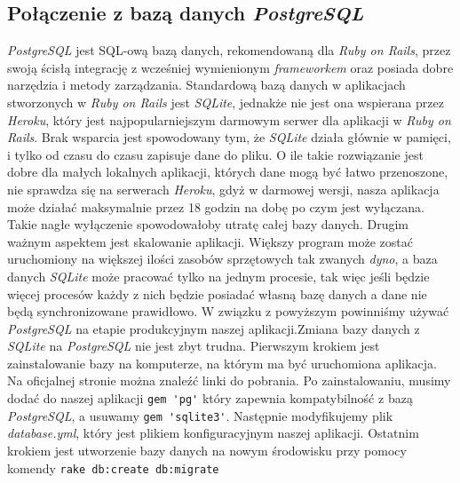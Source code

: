 \documentclass[openright]{xmgr}
\begin{document}
\subsection{Połączenie z bazą danych \textit{PostgreSQL}}
\textit{PostgreSQL} jest SQL-ową bazą danych, rekomendowaną dla \textit{Ruby on Rails}, przez swoją ścisłą integrację z wcześniej wymienionym \textit{frameworkem} oraz posiada dobre narzędzia i metody zarządzania. Standardową bazą danych w aplikacjach stworzonych w \textit{Ruby on Rails} jest \textit{SQLite}, jednakże nie jest ona wspierana przez \textit{Heroku}, który jest najpopularniejszym darmowym serwer dla aplikacji w \textit{Ruby on Rails}. Brak wsparcia jest spowodowany tym, że \textit{SQLite} działa głównie w pamięci, i tylko od czasu do czasu zapisuje dane do pliku. O ile takie rozwiązanie jest dobre dla małych lokalnych aplikacji, których dane mogą być łatwo przenoszone, nie sprawdza się na serwerach \textit{Heroku}, gdyż w darmowej wersji, nasza aplikacja może działać maksymalnie przez 18 godzin na dobę po czym jest wyłączana. Takie nagłe wyłączenie spowodowałoby utratę całej bazy danych. Drugim ważnym aspektem jest skalowanie aplikacji. Większy program może zostać uruchomiony na większej ilości zasobów sprzętowych tak zwanych \textit{dyno}, a baza danych \textit{SQLite} może pracować tylko na jednym procesie, tak więc jeśli będzie więcej procesów każdy z nich będzie posiadać własną bazę danych a dane nie będą synchronizowane prawidłowo. W związku z powyższym powinniśmy używać \textit{PostgreSQL} na etapie produkcyjnym naszej aplikacji.\newline \indent Zmiana bazy danych z \textit{SQLite} na \textit{PostgreSQL} nie jest zbyt trudna. Pierwszym krokiem jest zainstalowanie bazy na komputerze, na którym ma być uruchomiona aplikacja. Na oficjalnej stronie można znaleźć linki do pobrania. Po zainstalowaniu, musimy dodać do naszej aplikacji \verb|gem 'pg'| który zapewnia kompatybilność z bazą \textit{PostgreSQL}, a usuwamy \verb|gem 'sqlite3'|. Następnie modyfikujemy plik \textit{database.yml}, który jest plikiem konfiguracyjnym naszej aplikacji. Ostatnim krokiem jest utworzenie bazy danych na nowym środowisku przy pomocy komendy \verb|rake db:create db:migrate|  
\end{document}
